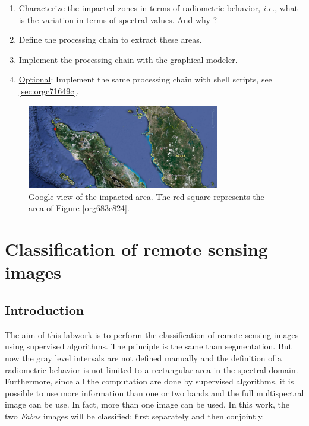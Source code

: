 \documentclass[a4paper,11pt,DIV=18]{scrartcl}
\begin{document}
\begin{work}
\begin{enumerate}
\item Characterize the  impacted zones in terms  of radiometric behavior,
\emph{i.e.}, what is the variation in terms of spectral values. And why ?
\item Define the processing chain to extract these areas.
\item Implement the processing chain with the graphical modeler.
\item \uline{Optional}: Implement  the same processing chain  with shell scripts,
see \ref{sec:orgc71649c}.
\end{enumerate}
\end{work}

\begin{figure}[htbp]
\centering
\includegraphics[width=0.75\textwidth]{./figures/google_bridge.jpg}
\caption{\label{fig:org9d1f22e}
Google view of the impacted area. The red square represents the area of Figure \ref{org683e824}.}
\end{figure}

\section{Classification of remote sensing images}
\label{sec:orgaa9e38a}
\subsection{Introduction}
\label{sec:orgca1824f}
The aim  of this labwork  is to  perform the classification  of remote
sensing images using supervised algorithms.  The principle is the same
than segmentation.  But  now the gray level intervals  are not defined
manually and the  definition of a radiometric behavior  is not limited
to a rectangular area in  the spectral domain.  Furthermore, since all
the computation are  done by supervised algorithms, it  is possible to
use more information than one or  two bands and the full multispectral
image can be use.  In fact, more  than one image can be used.  In this
work, the  two \emph{Fabas} images  will be classified: first  separately and
then conjointly.
\end{document}
